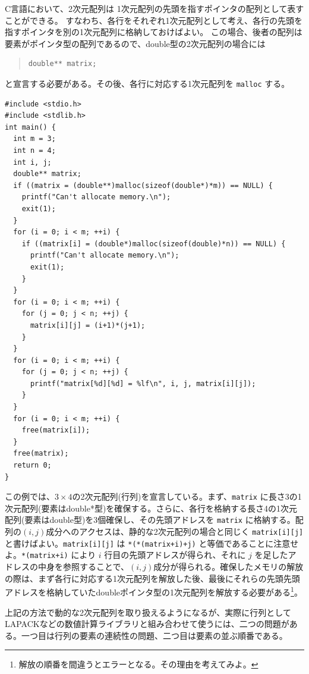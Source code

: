 C言語において、2次元配列は 1次元配列の先頭を指すポインタの配列として表すことができる。
すなわち、各行をそれぞれ1次元配列として考え、各行の先頭を指すポインタを別の1次元配列に格納しておけばよい。
この場合、後者の配列は要素がポインタ型の配列であるので、double型の2次元配列の場合には
\begin{quote}
\begin{verbatim}
double** matrix;
\end{verbatim}
\end{quote}
と宣言する必要がある。その後、各行に対応する1次元配列を \verb|malloc| する。
\begin{reidai}\label{ex:malloc-2dim}
\begin{verbatim}
#include <stdio.h>
#include <stdlib.h>
int main() {
  int m = 3;
  int n = 4;
  int i, j;
  double** matrix;
  if ((matrix = (double**)malloc(sizeof(double*)*m)) == NULL) {
    printf("Can't allocate memory.\n");
    exit(1);
  }
  for (i = 0; i < m; ++i) {
    if ((matrix[i] = (double*)malloc(sizeof(double)*n)) == NULL) {
      printf("Can't allocate memory.\n");
      exit(1);
    }
  }
  for (i = 0; i < m; ++i) {
    for (j = 0; j < n; ++j) {
      matrix[i][j] = (i+1)*(j+1);
    }
  }
  for (i = 0; i < m; ++i) {
    for (j = 0; j < n; ++j) {
      printf("matrix[%d][%d] = %lf\n", i, j, matrix[i][j]);
    }
  }
  for (i = 0; i < m; ++i) {
    free(matrix[i]);
  }
  free(matrix);
  return 0;
}
\end{verbatim}
\end{reidai} \noindent
この例では、$3 \times 4$の2次元配列(行列)を宣言している。まず、\verb|matrix| に長さ3の1次元配列(要素はdouble*型)を確保する。さらに、各行を格納する長さ4の1次元配列(要素はdouble型)を3個確保し、その先頭アドレスを \verb|matrix| に格納する。配列の$(i,j)$成分へのアクセスは、静的な2次元配列の場合と同じく \verb|matrix[i][j]| と書けばよい。\verb|matrix[i][j]| は \verb|*(*(matrix+i)+j)| と等価であることに注意せよ。\verb|*(matrix+i)| により $i$ 行目の先頭アドレスが得られ、それに $j$ を足したアドレスの中身を参照することで、$(i,j)$成分が得られる。確保したメモリの解放の際は、まず各行に対応する1次元配列を解放した後、最後にそれらの先頭先頭アドレスを格納していたdoubleポインタ型の1次元配列を解放する必要がある\footnote{解放の順番を間違うとエラーとなる。その理由を考えてみよ。}。

上記の方法で動的な2次元配列を取り扱えるようになるが、実際に行列としてLAPACKなどの数値計算ライブラリと組み合わせて使うには、二つの問題がある。一つ目は行列の要素の連続性の問題、二つ目は要素の並ぶ順番である。

